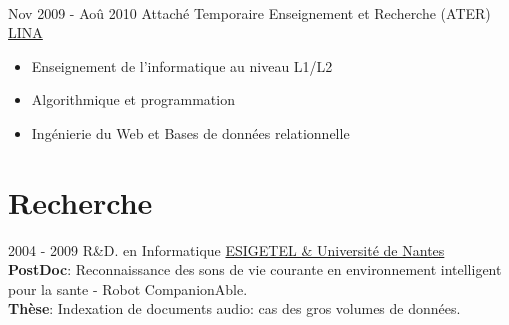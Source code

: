 \documentclass[letterpaper]{twentysecondcv} %
\begin{document}
\begin{twenty}
	   \\
		\twentyitem
		{Nov 2009 -}
		{Aoû 2010}
		{Attaché Temporaire Enseignement et Recherche (ATER)}
		{\href{http://www.lina.univ-nantes.fr/}{LINA}}
		{}
		{
		\begin{itemize}
		\item Enseignement de l'informatique au niveau L1/L2
		\item Algorithmique et programmation
		\item Ingénierie du Web et Bases de données relationnelle
		\end{itemize}
		}
\end{twenty}

\section{Recherche}
\begin{twenty}
	\twentyitem
    	{2004 - 2009}
		{}
        {R\&D. en Informatique}
        {\href{https://www.univ-nantes.fr/}{ESIGETEL \& Université de Nantes}}
        {}
	       {
	        \textbf{PostDoc}: Reconnaissance des sons de vie courante en environnement intelligent pour la sante - Robot CompanionAble. \\
	       	\textbf{Thèse}: Indexation de documents audio: cas des gros volumes de données.
	        {
			}
	       }
  
\end{twenty}

\end{document}
